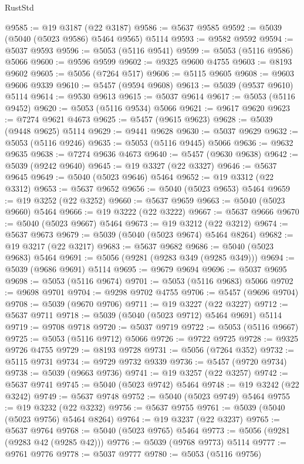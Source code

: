 \begin{lexlean}{RustStd}
\begin{coremodule}
@9585 := @19 @3187 (@22 @3187)
@9586 := @5637 @9585
@9592 := @5039 (@5040 (@5023 @9586) @5464 @9565) @5114
@9593 := @9582 @9592
@9594 := @5037 @9593
@9596 := @5053 (@5116 @9541)
@9599 := @5053 (@5116 @9586) @5066
@9600 := @9596 @9599
@9602 := @9325 @9600 @4755
@9603 := @8193 @9602
@9605 := @5056 (@7264 @517)
@9606 := @5115 @9605
@9608 := @9603 @9606 @9339
@9610 := @5457 (@9594 @9608)
@9613 := @5039 (@9537 @9610) @5114
@9614 := @9530 @9613
@9615 := @5037 @9614
@9617 := @5053 (@5116 @9452)
@9620 := @5053 (@5116 @9534) @5066
@9621 := @9617 @9620
@9623 := @7274 @9621 @4673
@9625 := @5457 (@9615 @9623)
@9628 := @5039 (@9448 @9625) @5114
@9629 := @9441 @9628
@9630 := @5037 @9629
@9632 := @5053 (@5116 @9246)
@9635 := @5053 (@5116 @9445) @5066
@9636 := @9632 @9635
@9638 := @7274 @9636 @4673
@9640 := @5457 (@9630 @9638)
@9642 := @5039 (@9242 @9640)
@9645 := @19 @3327 (@22 @3327)
@9646 := @5637 @9645
@9649 := @5040 (@5023 @9646) @5464
@9652 := @19 @3312 (@22 @3312)
@9653 := @5637 @9652
@9656 := @5040 (@5023 @9653) @5464
@9659 := @19 @3252 (@22 @3252)
@9660 := @5637 @9659
@9663 := @5040 (@5023 @9660) @5464
@9666 := @19 @3222 (@22 @3222)
@9667 := @5637 @9666
@9670 := @5040 (@5023 @9667) @5464
@9673 := @19 @3212 (@22 @3212)
@9674 := @5637 @9673
@9679 := @5039 (@5040 (@5023 @9674) @5464 @8264)
@9682 := @19 @3217 (@22 @3217)
@9683 := @5637 @9682
@9686 := @5040 (@5023 @9683) @5464
@9691 := @5056 (@9281 (@9283 @349 (@9285 @349)))
@9694 := @5039 (@9686 @9691) @5114
@9695 := @9679 @9694
@9696 := @5037 @9695
@9698 := @5053 (@5116 @9674)
@9701 := @5053 (@5116 @9683) @5066
@9702 := @9698 @9701
@9704 := @9298 @9702 @4755
@9706 := @5457 (@9696 @9704)
@9708 := @5039 (@9670 @9706)
@9711 := @19 @3227 (@22 @3227)
@9712 := @5637 @9711
@9718 := @5039 (@5040 (@5023 @9712) @5464 @9691) @5114
@9719 := @9708 @9718
@9720 := @5037 @9719
@9722 := @5053 (@5116 @9667)
@9725 := @5053 (@5116 @9712) @5066
@9726 := @9722 @9725
@9728 := @9325 @9726 @4755
@9729 := @8193 @9728
@9731 := @5056 (@7264 @352)
@9732 := @5115 @9731
@9734 := @9729 @9732 @9339
@9736 := @5457 (@9720 @9734)
@9738 := @5039 (@9663 @9736)
@9741 := @19 @3257 (@22 @3257)
@9742 := @5637 @9741
@9745 := @5040 (@5023 @9742) @5464
@9748 := @19 @3242 (@22 @3242)
@9749 := @5637 @9748
@9752 := @5040 (@5023 @9749) @5464
@9755 := @19 @3232 (@22 @3232)
@9756 := @5637 @9755
@9761 := @5039 (@5040 (@5023 @9756) @5464 @8264)
@9764 := @19 @3237 (@22 @3237)
@9765 := @5637 @9764
@9768 := @5040 (@5023 @9765) @5464
@9773 := @5056 (@9281 (@9283 @42 (@9285 @42)))
@9776 := @5039 (@9768 @9773) @5114
@9777 := @9761 @9776
@9778 := @5037 @9777
@9780 := @5053 (@5116 @9756)

\end{coremodule}
\end{lexlean}
